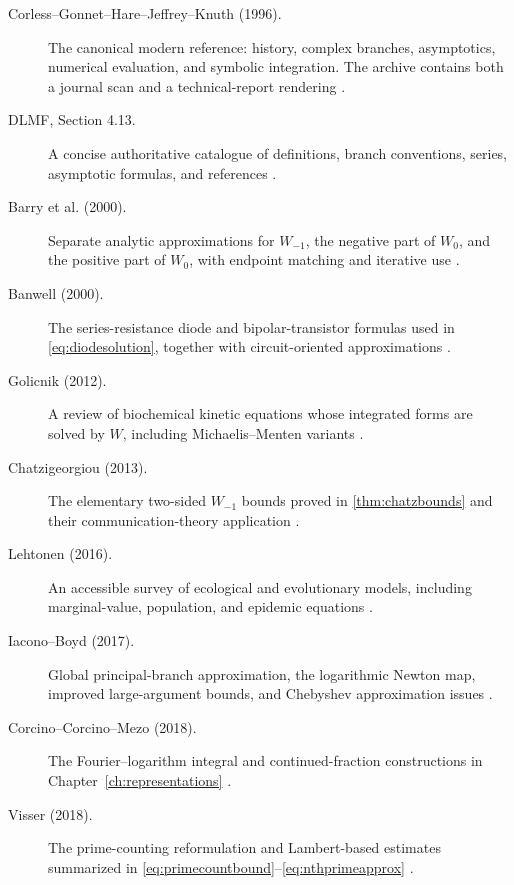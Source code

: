 \documentclass[11pt,oneside]{book}
\theoremstyle{definition}
\theoremstyle{remark}
\begin{document}
\begin{description}
\item[Corless--Gonnet--Hare--Jeffrey--Knuth (1996).]
The canonical modern reference: history, complex branches, asymptotics,
numerical evaluation, and symbolic integration.  The archive contains both a
journal scan and a technical-report rendering \cite{corless1996}.

\item[DLMF, Section 4.13.]
A concise authoritative catalogue of definitions, branch conventions,
series, asymptotic formulas, and references \cite{dlmf413}.

\item[Barry et al. (2000).]
Separate analytic approximations for $W_{-1}$, the negative part of $W_0$,
and the positive part of $W_0$, with endpoint matching and iterative use
\cite{barry2000}.

\item[Banwell (2000).]
The series-resistance diode and bipolar-transistor formulas used in
\cref{eq:diodesolution}, together with circuit-oriented approximations
\cite{banwell2000}.

\item[Golicnik (2012).]
A review of biochemical kinetic equations whose integrated forms are solved
by $W$, including Michaelis--Menten variants \cite{golicnik2012}.

\item[Chatzigeorgiou (2013).]
The elementary two-sided $W_{-1}$ bounds proved in
\cref{thm:chatzbounds} and their communication-theory application
\cite{chatzigeorgiou2013}.

\item[Lehtonen (2016).]
An accessible survey of ecological and evolutionary models, including
marginal-value, population, and epidemic equations \cite{lehtonen2016}.

\item[Iacono--Boyd (2017).]
Global principal-branch approximation, the logarithmic Newton map, improved
large-argument bounds, and Chebyshev approximation issues
\cite{iacono2017}.

\item[Corcino--Corcino--Mezo (2018).]
The Fourier--logarithm integral and continued-fraction constructions in
Chapter~\ref{ch:representations} \cite{corcino2018}.

\item[Visser (2018).]
The prime-counting reformulation and Lambert-based estimates summarized in
\cref{eq:primecountbound}--\eqref{eq:nthprimeapprox} \cite{visser2018}.


\end{description}
\end{document}
